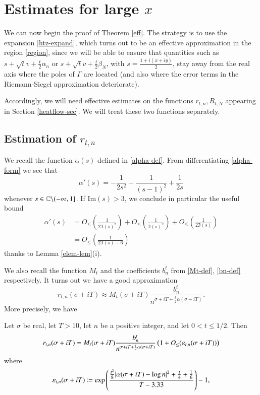 \section{Estimates for large $x$}\label{initial-sec}

We can now begin the proof of Theorem \ref{eff}.  
The strategy is to use the expansion \eqref{htz-expand}, which turns out to be an effective approximation in the region \eqref{region}, since we will be able to ensure that quantities such as $s + \sqrt{t} v + \frac{t}{2} \alpha_n$ or $s + \sqrt{t} v + \frac{t}{2} \beta_N$, with $s = \frac{1+i(x+iy)}{2}$, stay away from the real axis where the poles of $\Gamma$ are located (and also where the error terms in the Riemann-Siegel approximation deteriorate).  

Accordingly, we will need effective estimates on the functions $r_{t,n}, R_{t,N}$ appearing in Section \ref{heatflow-sec}.  We will treat these two functions separately.

\subsection{Estimation of $r_{t,n}$}

We recall the function $\alpha(s)$ defined in \eqref{alpha-def}.  From differentiating \eqref{alpha-form} we see that
\begin{equation}\label{alpha-deriv}
 \alpha'(s) = -\frac{1}{2s^2} - \frac{1}{(s-1)^2} + \frac{1}{2 s}
\end{equation}
whenever $s \in \mathbb{C} \backslash (-\infty,1]$.  If $\mathrm{Im}(s) > 3$, we conclude in particular the useful bound
\begin{equation}\label{alpha-deriv-bound}
\begin{split}
 \alpha'(s) &= O_{\leq}\left( \frac{1}{2\Im(s)^2} \right) + O_{\leq}\left( \frac{1}{\Im(s)^2} \right) + O_{\leq}\left( \frac{1}{2\Im(s)} \right) \\
 &= O_{\leq}\left( \frac{1}{2 \Im(s)-6} \right)
\end{split}
\end{equation}
thanks to Lemma \ref{elem-lem}(i).  

We also recall the function $M_t$ and the coefficients $b_n^t$ from \eqref{Mt-def}, \eqref{bn-def} respectively.  It turns out we have a good approximation
$$r_{t,n}(\sigma+iT) \approx M_t(\sigma+iT) \frac{b_n^t}{n^{\sigma+iT+\frac{t}{2} \alpha(\sigma+iT)}}.$$
More precisely, we have

\begin{proposition}\label{rtn-prop}  Let $\sigma$ be real, let $T>10$, let $n$ be a positive integer, and let $0 < t \leq 1/2$.  Then 
$$ r_{t,n}(\sigma+iT) = M_t(\sigma+iT) \frac{b_n^t}{n^{\sigma+iT+\frac{t}{2} \alpha(\sigma+iT)}} \left(1 + O_{\leq}(\varepsilon_{t,n}(\sigma+iT))\right)$$
where 
\begin{equation}\label{eps-def}
 \varepsilon_{t,n}(\sigma+iT) \coloneqq \exp\left( \frac{\frac{t^2}{8} |\alpha(\sigma+iT) - \log n|^2 + \frac{t}{4} + \frac{1}{6}}{T-3.33} \right)-1,
\end{equation}
\end{proposition}

